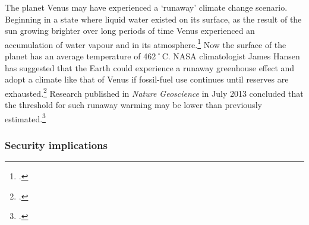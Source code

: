 The planet Venus may have experienced a `runaway' climate change scenario.
Beginning in a state where liquid water existed on its surface, as the result of the sun growing brighter over long periods of time Venus experienced an accumulation of water vapour and  in its atmosphere.\footcite[][]{VenusRunaway}
Now the surface of the planet has an average temperature of 462˚C.
NASA climatologist James Hansen has suggested that the Earth could experience a runaway greenhouse effect and adopt a climate like that of Venus if fossil-fuel use continues until reserves are exhausted.\footcite[][p. 22-23]{HansenVenusThreat}
Research published in \emph{Nature Geoscience} in July 2013 concluded that the threshold for such runaway warming may be lower than previously estimated.\footcite[][]{Goldblatt2013}



	\subsubsection{Security implications}
	
	
	
